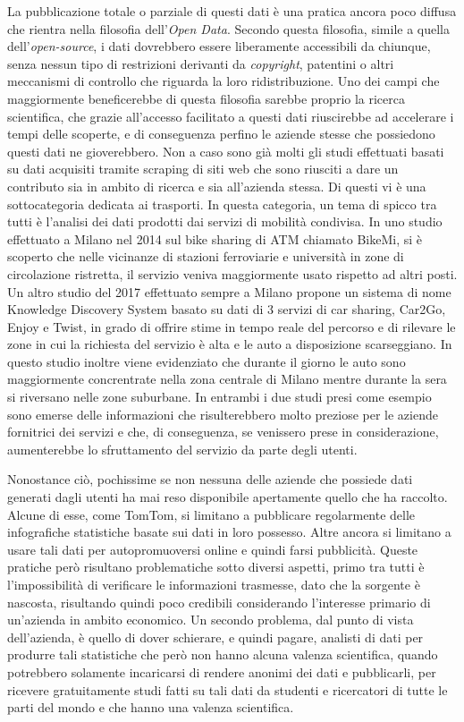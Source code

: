 La pubblicazione totale o parziale di questi dati è una pratica ancora poco diffusa che rientra nella filosofia dell'\emph{Open Data}. Secondo questa filosofia, simile a quella dell'\emph{open-source}, i dati dovrebbero essere liberamente accessibili da chiunque, senza nessun tipo di restrizioni derivanti da \emph{copyright}, patentini o altri meccanismi di controllo che riguarda la loro ridistribuzione. Uno dei campi che maggiormente beneficerebbe di questa filosofia sarebbe proprio la ricerca scientifica, che grazie all'accesso facilitato a questi dati riuscirebbe ad accelerare i tempi delle scoperte, e di conseguenza perfino le aziende stesse che possiedono questi dati ne gioverebbero. Non a caso sono già molti gli studi effettuati basati su dati acquisiti tramite scraping di siti web che sono riusciti a dare un contributo sia in ambito di ricerca e sia all'azienda stessa. Di questi vi è una sottocategoria dedicata ai trasporti. In questa categoria, un tema di spicco tra tutti è l'analisi dei dati prodotti dai servizi di mobilità condivisa. In uno studio effettuato a Milano nel 2014\cite{croci2014} sul bike sharing di ATM chiamato BikeMi, si è scoperto che nelle vicinanze di stazioni ferroviarie e università in zone di circolazione ristretta, il servizio veniva maggiormente usato rispetto ad altri posti. Un altro studio del 2017 effettuato sempre a Milano \cite{pagani2017} propone un sistema di nome Knowledge Discovery System basato su dati di 3 servizi di car sharing, Car2Go, Enjoy e Twist, in grado di offrire stime in tempo reale del percorso e di rilevare le zone in cui la richiesta del servizio è alta e le auto a disposizione scarseggiano. In questo studio inoltre viene evidenziato che durante il giorno le auto sono maggiormente concrentrate nella zona centrale di Milano mentre durante la sera si riversano nelle zone suburbane. In entrambi i due studi presi come esempio sono emerse delle informazioni che risulterebbero molto preziose per le aziende fornitrici dei servizi e che, di conseguenza, se venissero prese in considerazione, aumenterebbe lo sfruttamento del servizio da parte degli utenti.

Nonostance ciò, pochissime se non nessuna delle aziende che possiede dati generati dagli utenti ha mai reso disponibile apertamente quello che ha raccolto. Alcune di esse, come TomTom, si limitano a pubblicare regolarmente delle infografiche statistiche basate sui dati in loro possesso. Altre ancora si limitano a usare tali dati per autopromuoversi online e quindi farsi pubblicità. Queste pratiche però risultano problematiche sotto diversi aspetti, primo tra tutti è l'impossibilità di verificare le informazioni trasmesse, dato che la sorgente è nascosta, risultando quindi poco credibili considerando l'interesse primario di un'azienda in ambito economico. Un secondo problema, dal punto di vista dell'azienda, è quello di dover schierare, e quindi pagare, analisti di dati per produrre tali statistiche che però non hanno alcuna valenza scientifica, quando potrebbero solamente incaricarsi di rendere anonimi dei dati e pubblicarli, per ricevere gratuitamente studi fatti su tali dati da studenti e ricercatori di tutte le parti del mondo e che hanno una valenza scientifica.

